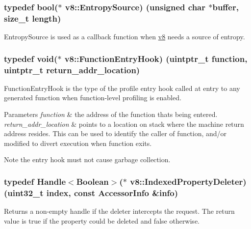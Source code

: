 \subsubsection[{Entropy\+Source}]{\setlength{\rightskip}{0pt plus 5cm}typedef bool($\ast$ v8\+::\+Entropy\+Source) (unsigned char $\ast$buffer, size\+\_\+t length)}\label{namespacev8_ab699f4bbbb56350e6e915682e420fcdc}
Entropy\+Source is used as a callback function when \hyperlink{namespacev8}{v8} needs a source of entropy. \hypertarget{namespacev8_aaf07fb6bb13f295da3c6568938b7dec5}{}
\subsubsection[{Function\+Entry\+Hook}]{\setlength{\rightskip}{0pt plus 5cm}typedef void($\ast$ v8\+::\+Function\+Entry\+Hook) (uintptr\+\_\+t function, uintptr\+\_\+t return\+\_\+addr\+\_\+location)}\label{namespacev8_aaf07fb6bb13f295da3c6568938b7dec5}
Function\+Entry\+Hook is the type of the profile entry hook called at entry to any generated function when function-\/level profiling is enabled.


\begin{DoxyParams}{Parameters}
{\em function} & the address of the function that\textquotesingle{}s being entered. \\
\hline
{\em return\+\_\+addr\+\_\+location} & points to a location on stack where the machine return address resides. This can be used to identify the caller of {\ttfamily function}, and/or modified to divert execution when {\ttfamily function} exits.\\
\hline
\end{DoxyParams}
\begin{DoxyNote}{Note}
the entry hook must not cause garbage collection. 
\end{DoxyNote}
\hypertarget{namespacev8_a3a7c18d62a0d1f2d12845051920be592}{}
\subsubsection[{Indexed\+Property\+Deleter}]{\setlength{\rightskip}{0pt plus 5cm}typedef {\bf Handle}$<${\bf Boolean}$>$($\ast$ v8\+::\+Indexed\+Property\+Deleter) (uint32\+\_\+t index, const {\bf Accessor\+Info} \&info)}\label{namespacev8_a3a7c18d62a0d1f2d12845051920be592}
Returns a non-\/empty handle if the deleter intercepts the request. The return value is true if the property could be deleted and false otherwise. \hypertarget{namespacev8_a15ab299eff53946ab483b762a4cb20dc}{}
